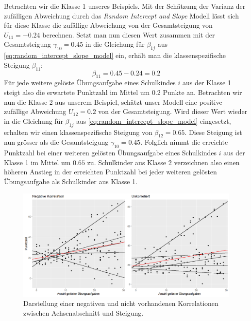 \documentclass[12pt]{article}\usepackage[]{graphicx}\usepackage[]{color}
\begin{document}
Betrachten wir die Klasse 1 unseres Beispiels. Mit der Schätzung der Varianz der zufälligen Abweichung durch das \textit{Random Intercept and Slope} Modell lässt sich für diese Klasse die zufällige Abweichung von der Gesamtsteigung von $U_{11} = -0.24$ berechnen. Setzt man nun diesen Wert zusammen mit der Gesamtsteigung $\gamma_{10} = 0.45$ in die Gleichung für $\beta_{1j}$ aus \eqref{eq:random_intercept_slope_model} ein, erhält man die klassenspezifische Steigung $\beta_{11}$:
\begin{equation} \label{eq:beta1_example}	
\beta_{11} = 0.45 - 0.24 = 0.2
\end{equation} 
Für jede weitere gelöste Übungsaufgabe eines Schulkindes $i$ aus der Klasse 1 steigt also die erwartete Punktzahl im Mittel um $0.2$ Punkte an. Betrachten wir nun die Klasse 2 aus unserem Beispiel, schätzt unser Modell eine positive zufällige Abweichung $U_{12} = 0.2$ von der Gesamtsteigung. Wird dieser Wert wieder in die Gleichung für $\beta_{1j}$ aus \eqref{eq:random_intercept_slope_model} eingesetzt, erhalten wir einen klassenspezifische Steigung von $\beta_{12} = 0.65$. Diese Steigung ist nun grösser als die Gesamtsteigung $\gamma_{10} = 0.45$. Folglich nimmt die erreichte Punktzahl bei einer weiteren gelösten Übungsaufgabe eines Schulkindes $i$ aus der Klasse 1 im Mittel um $0.65$ zu. Schulkinder aus Klasse 2 verzeichnen also einen höheren Anstieg in der erreichten Punktzahl bei jeder weiteren gelösten Übungsaufgabe als Schulkinder aus Klasse 1. 

\begin{figure}[b!]
\centering
\includegraphics[width = \textwidth]{./figures/corr_s_i}
\caption{Darstellung einer negativen und nicht vorhandenen Korrelationen zwischen Achsenabschnitt und Steigung.}
\label{fig:corr_s_i}
\end{figure}
\end{document}

